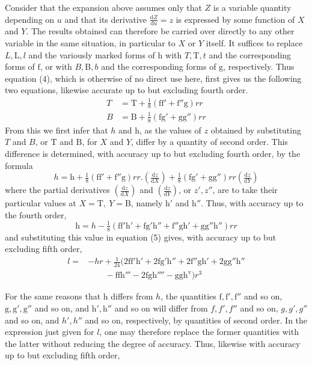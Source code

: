 %
\par\noindent\hspace*{\parindent} Consider that the expansion above assumes only that \(Z\) is a variable quantity depending on \(u\) and that its derivative \(\frac{\mathrm{d}Z}{\mathrm{d}u}=z\) is expressed by some function of \(X\) and \(Y\). The results obtained can therefore be carried over directly to any other variable in the same situation, in particular to \(X\) or \(Y\) itself. It suffices to replace \(L,\mathrm{L},l\) and the variously marked forms of \(\mathrm{h}\) with \(T,\mathrm{T},t\) and the corresponding forms of \(\mathrm{f}\), or with \(B,\mathrm{B},b\) and the corresponding forms of \(\mathrm{g}\), respectively. Thus equation (4), which is otherwise of no direct use here, first gives us the following two equations, likewise accurate up to but excluding fourth order.
\[
\begin{aligned}
T&=\mathrm{T}+\tfrac18(\mathrm{ff}'+\mathrm{f}''\mathrm{g})rr\\
B&=\mathrm{B}+\tfrac18(\mathrm{fg}'+\mathrm{gg}'')rr
\end{aligned}
\]
From this we first infer that \(h\) and \(\mathrm{h}\), as the values of \(z\) obtained by substituting \(T\) and \(B\), or \(\mathrm{T}\) and \(\mathrm{B}\), for \(X\) and \(Y\), differ by a quantity of second order. This difference is determined, with accuracy up to but excluding fourth order, by the formula
\[
h=\mathrm{h}+\tfrac18(\mathrm{ff}'+\mathrm{f}''\mathrm{g})rr\mathord{.}(\tfrac{\mathrm{d}z}{\mathrm{d}X})+\tfrac18(\mathrm{fg}'+\mathrm{gg}'')rr(\tfrac{\mathrm{d}z}{\mathrm{d}Y})
\]
where the partial derivatives \((\frac{\mathrm{d}z}{\mathrm{d}X})\) and \((\frac{\mathrm{d}z}{\mathrm{d}Y})\), or \(z',z''\), are to take their particular values at \(X=\mathrm{T},\ Y=\mathrm{B}\), namely \(\mathrm{h}'\) and \(\mathrm{h}''\). Thus, with accuracy up to the fourth order,
\[
\mathrm{h}=h-\tfrac18(\mathrm{ff'h}'+\mathrm{fg'h}''+\mathrm{f''gh}'+\mathrm{gg''h}'')rr
\]
and substituting this value in equation (5) gives, with accuracy up to but excluding fifth order,
\[
\begin{aligned}
l={}&-hr+\tfrac1{24}(2\mathrm{ff'h}'+2\mathrm{fg'h}''+2\mathrm{f''gh}'+2\mathrm{gg''h}''\\
&\qquad-\mathrm{ffh}'''-2\mathrm{fgh}''''-\mathrm{ggh}^{\mathrm{v}})r^3
\end{aligned}
\]

\indent For the same reasons that \(\mathrm{h}\) differs from \(h\), the quantities \(\mathrm{f},\mathrm{f}',\mathrm{f}''\) and so on, \(\mathrm{g},\mathrm{g}',\mathrm{g}''\) and so on, and \(\mathrm{h}',\mathrm{h}''\) and so on will differ from \(f,f',f''\) and so on, \(g,g',g''\) and so on, and \(h',h''\) and so on, respectively, by quantities of second order. In the expression just given for \(l\), one may therefore replace the former quantities with the latter without reducing the degree of accuracy. Thus, likewise with accuracy up to but excluding fifth order,
